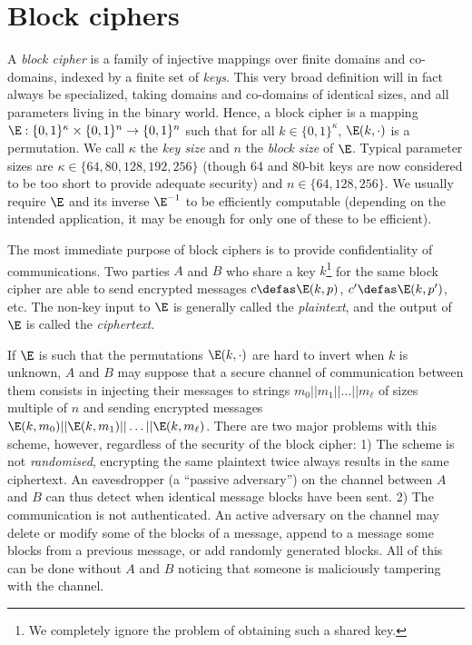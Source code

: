 \section{Block ciphers}

A \emph{block cipher} is a family of injective mappings over finite domains and co-domains, indexed by a finite set of \emph{keys}. This very broad definition will
in fact always be specialized, taking domains and co-domains of identical sizes, and all parameters living in the binary world. Hence, a block cipher
is a mapping $\E : \{0,1\}^\kappa \times \{0,1\}^n \rightarrow \{0,1\}^n$ such that for all $k \in \{0,1\}^\kappa$, $\E(k,\cdot)$ is a permutation.
We call $\kappa$ the \emph{key size} and $n$ the \emph{block size} of $\E$. Typical parameter sizes are $\kappa \in \{64, 80, 128, 192, 256\}$ (though
64 and 80-bit keys are now considered to be too short to provide adequate security) and $n \in \{64, 128, 256\}$.
We usually require $\E$ and its inverse $\E^{-1}$ to be efficiently computable (depending on the intended application, it may be enough for only
one of these to be efficient).

The most immediate purpose of block ciphers is to provide confidentiality of communications. Two parties $A$ and $B$ who share a key $k$\footnote{We
completely ignore the problem of obtaining such a shared key.} for the same
block cipher are able to send encrypted messages $c \defas \E(k,p)$, $c' \defas \E(k,p')$, etc. The non-key input to $\E$ is generally called
the \emph{plaintext}, and the output of $\E$ is called the \emph{ciphertext}.

If $\E$ is such that the permutations $\E(k,\cdot)$ are hard to invert when $k$ is unknown, $A$ and $B$ may suppose that a secure channel of communication
between them consists in injecting their messages to strings $m_0||m_1||\ldots||m_\ell$ of sizes multiple of $n$ and sending encrypted messages
$\E(k,m_0)||\E(k,m_1)||\ldots||\E(k,m_\ell)$. There are two major problems with this scheme, however, regardless of the security of the block
cipher: 1) The scheme is not \emph{randomised}, \ie encrypting the same plaintext twice always results in the same ciphertext. An eavesdropper
(a ``passive adversary'') on the channel between $A$ and $B$ can thus detect when identical message blocks have been sent. 2) The
communication is not authenticated. An active adversary on the channel may delete or modify some of the blocks of a message, append to a message
some blocks from a previous message, or add randomly generated blocks. All of this can be done without $A$ and $B$ noticing that someone
is maliciously tampering with the channel. 

